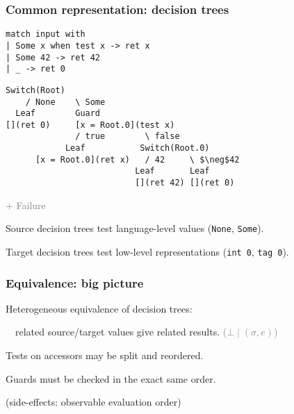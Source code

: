 \documentclass[dvipsnames]{beamer}
\begin{document}
\begin{frame}[fragile]
  \frametitle{Common representation: decision trees}
\begin{lstlisting}
match input with
| Some x when test x -> ret x
| Some 42 -> ret 42
| _ -> ret 0
\end{lstlisting}

\vfill\pause

\begin{lstlisting}[columns=fixed]
    Switch(Root)
    / None    \ Some
  Leaf        Guard
[](ret 0)     [x = Root.0](test x)
              / true        \ false
            Leaf           Switch(Root.0)
      [x = Root.0](ret x)   / 42     \ $\neg$42
                          Leaf       Leaf
                          [](ret 42) [](ret 0)
\end{lstlisting}
\hfill\textcolor{gray}{+ Failure}

\vfill\pause

Source decision trees test language-level values (\texttt{None}, \texttt{Some}).

Target decision trees test low-level representations (\texttt{int 0}, \texttt{tag 0}).

\end{frame}

\begin{frame}
  \frametitle{Equivalence: big picture}

  Heterogeneous equivalence of decision trees:

  $\quad$related source/target values give related results.
  \hfill\textcolor{gray}{($\bot \mid (\sigma, e)$)}

  \vfill

  Tests on accessors may be split and reordered.

  \vfill

  Guards must be checked in the exact same order.

  (side-effects: observable evaluation order)
\end{frame}
\end{document}
